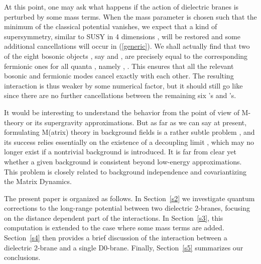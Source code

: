 \documentclass[a4paper,12pt]{article}
\begin{document}
At this point, one may ask what happens if the action of dielectric branes is perturbed by some mass terms. When the mass parameter is chosen such that the minimum of the classical potential vanishes, we expect that a kind of supersymmetry, similar to \coordHE{} SUSY in 4 dimensions \cite{PS}, will be restored and some additional cancellations will occur in (\ref{generic}). We shall actually find that two of the eight bosonic objects \coordHE{}, say \coordHE{} and \coordHE{}, are precisely equal to the corresponding fermionic ones for all quanta \coordHE{}, namely \coordHE{}, \coordHE{}. This ensures that all the relevant bosonic and fermionic modes cancel exactly with each other. The resulting interaction is thus weaker by some numerical factor, but it should still go like \coordHE{} since there are no further cancellations between the remaining six \coordHE{}'s and \coordHE{}'s.

It would be interesting to understand the \coordHE{} behavior from the point of view of M-theory or its supergravity approximations. But as far as we can say at present, formulating M(atrix) theory in background fields is a rather subtle problem \cite{DOS}, and its success relies essentially on the existence of a decoupling limit \cite{BFSS}, which may no longer exist if a nontrivial background is introduced. It is far from clear yet whether a given background is consistent beyond low-energy approximations. This problem is closely related to background independence and covariantizing the Matrix Dynamics.

The present paper is organized as follows. In Section~\ref{s2} we investigate quantum corrections to the long-range potential between two dielectric 2-branes, focusing on the distance dependent part of the interactions. In Section~\ref{s3}, this computation is extended to the case where some mass terms are added. Section~\ref{s4} then provides a brief discussion of the interaction between a dielectric 2-brane and a single D0-brane. Finally, Section~\ref{s5} summarizes our conclusions.
\end{document}
